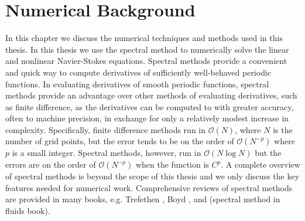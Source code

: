 \chapter{Numerical Background}

In this chapter we discuss the numerical techniques and methods used in this thesis. In this thesis we use the spectral method to numerically solve the linear and nonlinear Navier-Stokes equations. Spectral methods provide a convenient and quick way to compute derivatives of sufficiently well-behaved periodic functions. In evaluating derivatives of smooth periodic functions, spectral methods provide an advantage over other methods of evaluating derivatives, such as finite difference, as the derivatives can be computed to with greater accuracy, often to machine precision, in exchange for only a relatively modest increase in complexity. Specifically, finite difference methods run in $\mathcal{O}(N)$, where $N$ is the number of grid points, but the error tends to be on the order of $\mathcal{O}(N^{-p})$ where $p$ is a small integer. Spectral methods, however, run in $\mathcal{O}(N\log N)$ but the errors are on the order of $\mathcal{O}(N^{-p})$ when the function is $C^{p}$\cite{trefethen_spectral}. A complete overview of spectral methods is beyond the scope of this thesis and we only discuss the key features needed for numerical work. Comprehensive reviews of spectral methods are provided in many books, e.g. Trefethen \cite{trefethen_spectral}, Boyd \cite{boyd2001}, and (spectral method in fluids book). 


